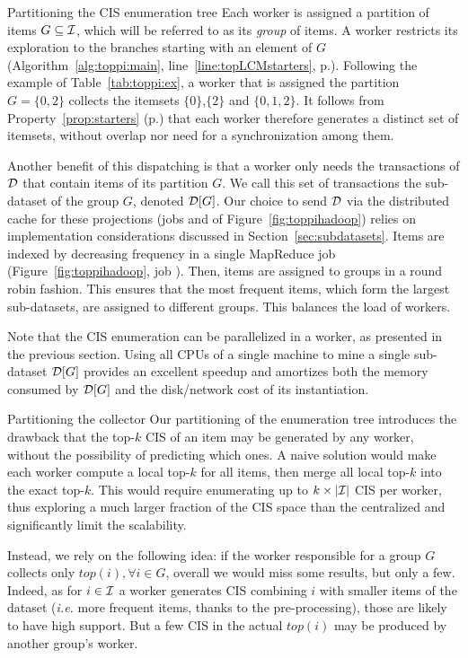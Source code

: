 \begin{paragraph}{Partitioning the CIS enumeration tree}
	Each worker is assigned a partition of items $G \subseteq {\cal I}$,
	which will be referred to as its {\em group} of items.
	A worker restricts its exploration to the branches starting with an element of $G$
	(Algorithm~\ref{alg:toppi:main}, line~\ref{line:topLCMstarters}, p.\pageref{alg:toppi:main}).
	Following the example of Table~\ref{tab:toppi:ex},
	a worker that is assigned the partition $G=\{0,2\}$ collects the itemsets $\{0\}$,$\{2\}$ and $\{0,1,2\}$.
	It follows from Property~\ref{prop:starters} (p.\pageref{prop:starters})
	that each worker therefore generates a distinct set of itemsets,
	without overlap nor need for a synchronization among them.

	Another benefit of this dispatching is that
	a worker only needs the transactions of ${\cal D}$ that contain items of its partition $G$.
	We call this set of transactions the sub-dataset of the group $G$, denoted ${\cal D}[G]$.
	Our choice to send ${\cal D}$ via the distributed cache for these projections
	(jobs  and  of Figure~\ref{fig:toppihadoop})
	relies on implementation considerations discussed in Section~\ref{sec:subdatasets}.
	Items are indexed by decreasing frequency in a single MapReduce job
	(Figure~\ref{fig:toppihadoop}, job ).
	Then, items are assigned to groups in a round robin fashion.
	This ensures that the most frequent items,
	which form the largest sub-datasets,
	are assigned to different groups.
	This balances the load of workers.

	Note that the CIS enumeration can be parallelized in a worker,
	as presented in the previous section.
	Using all CPUs of a single machine to mine a single sub-dataset ${\cal D}[G]$
	provides an excellent speedup and
	amortizes both the memory consumed by ${\cal D}[G]$
	and the disk/network cost of its instantiation.
\end{paragraph}


\begin{paragraph}{Partitioning the collector}
	Our partitioning of the enumeration tree introduces the drawback that
	the top-$k$ CIS of an item may be generated by any worker,
	without the possibility of predicting which ones.
	A naive solution would make each worker compute a local top-$k$ for all items,
	then merge all local top-$k$ into the exact top-$k$.
	This would require enumerating up to $k\times|{\cal I}|$ CIS per worker,
	thus exploring a much larger fraction of the CIS space than the centralized \toppi
	and significantly limit the scalability.

	Instead, we rely on the following idea:
	if the worker responsible for a group $G$ collects only $\mathit{top(i)}, \forall i \in G$,
	overall we would miss some results, but only a few.
	Indeed, as for $i \in \cal I$ a worker generates CIS combining $i$
	with smaller items of the dataset (\textit{i.e.} more frequent items, thanks to the pre-processing),
	those are likely to have high support.
	But a few CIS in the actual $\mathit{top}(i)$ may be produced by another group's worker.
\end{paragraph}

